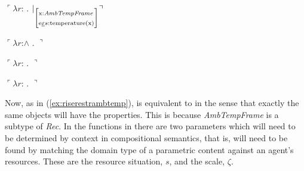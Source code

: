 \begin{ex} 
\begin{subex} 
 
\item $\ulcorner\lambda r$: . 
            $|_{\text{\smallrecord{\smalltfield{x}{\textit{AmbTempFrame}}\\
        \smallrfield{e}{$s$}{temperature(x)}}}}\urcorner$ 
 
\item $\ulcorner\lambda r$:\d{$\wedge$} . 
            $\urcorner$ 

\item $\ulcorner\lambda
  r$: . 
            $\urcorner$

\item $\ulcorner\lambda
  r$: . 
            $\urcorner$
 
\end{subex}  
\end{ex} 
Now, as in (\ref{ex:riserestrambtemp}),  is equivalent
 to  in the sense that exactly the same objects will
have the properties.  This is because \textit{AmbTempFrame} is a
subtype of \textit{Rec}.  In the functions in \preveg{} there are two
parameters which will need to be determined by context in
compositional semantics, that is, will need to be found by matching
the domain type of a parametric content against an agent's resources.
These are the resource situation, $s$, and the scale, $\zeta$.



